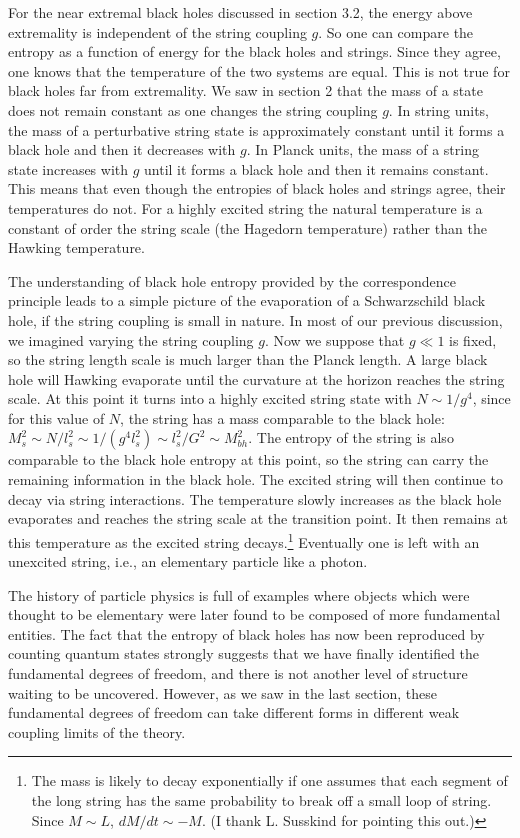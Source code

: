\documentclass[12pt]{article}
\begin{document}
For the near extremal black holes discussed in section 3.2, the energy
above extremality is independent of the string coupling $g$. 
So one
can compare the entropy as a function of energy for the black holes and
strings. Since they agree, one knows that the temperature of the two
systems are equal. This is not true for black holes far from extremality.
We saw in section 2 that the mass of a state does not remain
constant as one changes the string coupling $g$. In string units, the
mass of a perturbative string state is approximately constant until it
forms a black hole and then it decreases with $g$. In
Planck units, the mass of a string state increases with $g$ until it
forms a black hole and then it remains constant. This means that even
though the entropies of black holes and strings agree, their temperatures
do not. For a highly excited string the natural temperature is a
constant of order the string scale  (the Hagedorn temperature) rather than
the Hawking temperature.  


The understanding of black hole entropy provided by the correspondence
principle leads to a simple picture of the evaporation of a Schwarzschild
black hole, if the string coupling is small in nature. 
In most of our previous discussion, we imagined varying the
string coupling $g$. Now we suppose that $g \ll 1$ is fixed,
so the
string length scale is much larger than the Planck length.
A large black hole will Hawking evaporate until the curvature at the
horizon
reaches the string scale. At this point it turns into a highly
excited string state with $N \sim 1/g^4$, since for this value of $N$,
the string has a mass  comparable to the black hole: $M_s^2 \sim N/l_s^2 \sim
1/(g^4 l_s^2) \sim l_s^2/G^2 \sim M_{bh}^2$.  The entropy of the string is also
comparable to the black hole entropy at this point, so the string can
carry the remaining information in the black hole.
The excited string will then continue
to decay via string interactions. The temperature slowly increases as the black 
hole evaporates and reaches the string scale at the transition point. It then
remains at this temperature as the excited string decays.\footnote{The mass
is likely to decay exponentially if one assumes that each segment of the long
string has the same probability to break off a small loop of string. Since
$M\sim L$, $dM/dt \sim -M$. (I thank L. Susskind for pointing this out.)} 
Eventually
one is left with an unexcited string, i.e., an elementary particle
like a photon.

The history of particle physics is full of examples where objects which were
thought to be elementary were later found to be composed of more
fundamental entities.
The fact that the entropy of black holes has now been reproduced by
counting quantum states strongly suggests that we have finally identified
the fundamental degrees of freedom, and there is not another level
of structure waiting to be uncovered. However, as we saw in the  last
section, these fundamental degrees of freedom can take different forms in 
different weak coupling limits of the theory.
\end{document}
